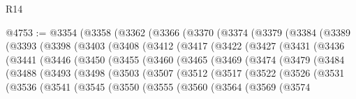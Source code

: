 \begin{lexlean}{R14}
\begin{coremodule}
@4753 := @3354
    (@3358
      (@3362
        (@3366
          (@3370
            (@3374
              (@3379
                (@3384
                  (@3389
                    (@3393
                      (@3398
                        (@3403
                          (@3408
                            (@3412
                              (@3417
                                (@3422
                                  (@3427
                                    (@3431
                                      (@3436
                                        (@3441
                                          (@3446
                                            (@3450
                                              (@3455
                                                (@3460
                                                  (@3465
                                                    (@3469
                                                      (@3474
                                                        (@3479
                                                          (@3484
                                                            (@3488
                                                              (@3493
                                                                (@3498
                                                                  (@3503
                                                                    (@3507
                                                                      (@3512
                                                                        (@3517
                                                                          (@3522
                                                                            (@3526
                                                                              (@3531
                                                                                (@3536
                                                                                  (@3541
                                                                                    (@3545
                                                                                      (@3550
                                                                                        (@3555
                                                                                          (@3560
                                                                                            (@3564
                                                                                              (@3569
                                                                                                (@3574

\end{coremodule}
\end{lexlean}
